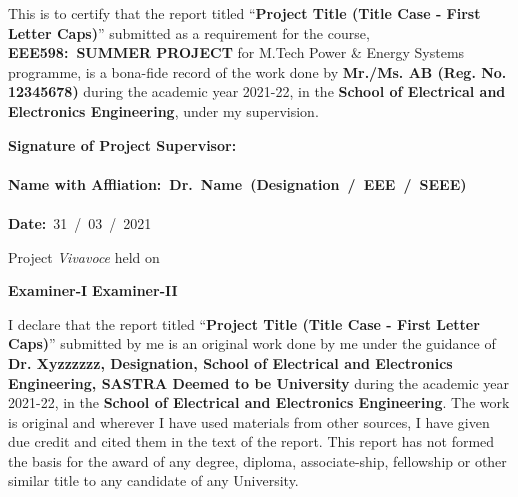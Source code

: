 \documentclass[a4paper, 12pt, oneside]{sastra1}
\begin{document}
	\begin{doublespace}
		\linespread{2}
		
		This is to certify that the report titled ``\textbf{Project Title (Title Case - First Letter Caps)}'' submitted as a requirement for the course, {\textbf{EEE598:~SUMMER PROJECT}} for M.Tech Power \& Energy Systems programme, is a bona-fide record of the work done by \textbf{Mr./Ms. AB (Reg. No. 12345678)} during the academic year 2021-22, in the \textbf{School of Electrical and Electronics Engineering}, under my supervision.
		
	\end{doublespace}
	\vspace*{0.4in}
	
	\noindent\textbf{Signature of Project Supervisor:}~	\\ %
	\\
	\textbf{Name with Affliation\hspace*{19mm}:~\textbf{Dr.~Name}~(Designation~/~EEE~/~SEEE)}	\\
	\\
	\textbf{Date\hspace*{48.25mm}:}~31~/~03~/~2021\\%
	
	\vspace*{0.35in}
	
	\noindent Project \textit{Vivavoce} held on
	
	\vspace*{0.50in}
	\noindent \textbf{Examiner-I} \hspace*{120mm} \textbf{Examiner-II}
	
	
	\declaration
	
	
	\begin{doublespace}
		\linespread{2}
		
		I declare that the report titled ``\textbf{Project Title (Title Case - First Letter Caps)}'' submitted by me is an original work done by me under the guidance of \textbf{Dr. Xyzzzzzz, Designation, School of Electrical and Electronics Engineering, SASTRA Deemed to be University} during the academic year 2021-22, in the \textbf{School of Electrical and Electronics Engineering}. The work is original and wherever I have used materials from other sources, I have given due credit and cited them in the text of the report. This report has not formed the basis for the award of any degree, diploma, associate-ship, fellowship or other similar title to any candidate of any University.\\
		
	\end{doublespace}
	
\end{document}
